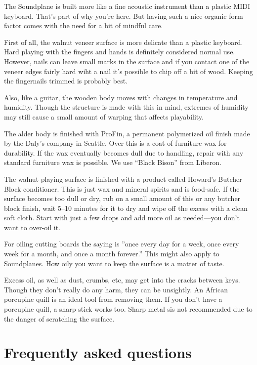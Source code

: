The Soundplane is built more like a fine acoustic instrument than a plastic MIDI keyboard.  That's part of why you're here.  But having such a nice organic form factor comes with the need for a bit of mindful care.  

First of all, the walnut veneer surface is more delicate than a plastic keyboard.  Hard playing with the fingers and hands is definitely considered normal use.  However, nails can leave small marks in the surface and if you contact one of the veneer edges fairly hard wiht a nail it's possible to chip off a bit of wood.  Keeping the fingernails trimmed is probably best.  

Also, like a guitar, the wooden body moves with changes in temperature and humidity.  Though the structure is made with this in mind, extremes of humidity may still cause a small amount of warping that affects playability.  

The alder body is finished with ProFin, a permanent polymerized oil finish made by the Daly’s company in Seattle.  Over this is a coat of furniture wax for durability.  If the wax eventually becomes dull due to handling, repair with any standard furniture wax is possible.  We use “Black Bison” from Liberon.  

The walnut playing surface is finished with a product called Howard’s Butcher Block conditioner.  This is just wax and mineral spirits and is food-safe.  If the surface becomes too dull or dry, rub on a small amount of this or any butcher block finish, wait 5–10 minutes for it to dry and wipe off the excess with a clean soft cloth.  Start with just a few drops and add more oil as needed—you don't want to over-oil it.  

For oiling cutting boards the saying is ”once every day for a week, once every week for a month, and once a month forever.”  This might also apply to Soundplanes.  How oily you want to keep the surface is a matter of taste.  

Excess oil, as well as dust, crumbs, etc, may get into the cracks between keys.  Though they don't really do any harm, they can be unsightly.  An African porcupine quill is an ideal tool from removing them.  If you don't have a porcupine quill, a sharp stick works too.  Sharp metal sis not recommended due to the danger of scratching the surface. 


\appendix

\chapter{Frequently asked questions}




\printindex




